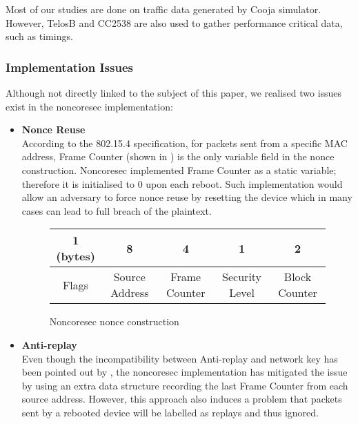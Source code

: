 Most of our studies are done on traffic data generated by Cooja simulator\cite{Contiki}. However, TelosB\cite{TelosB} and CC2538\cite{CC2538} are also used to gather performance critical data, such as timings.

\subsubsection{Implementation Issues}
Although not directly linked to the subject of this paper, we realised two issues exist in the noncoresec implementation:
\begin{itemize}
	\item \textbf{Nonce Reuse} \\
	According to the 802.15.4 specification\cite{802154}, for packets sent from a specific MAC address, Frame Counter (shown in ) is the only variable field in the nonce construction. Noncoresec implemented Frame Counter as a static variable; therefore it is initialised to 0 upon each reboot. Such implementation would allow an adversary to force nonce reuse by resetting the device which in many cases can lead to full breach of the plaintext.
	
	\begin{figure}[th!]
	\centering
	\begin{tabular}{|c|c|c|c|c|}
		\hline 
		1 (bytes) & 8              & 4             & 1              & 2             \\ \hline
		Flags      & Source Address & Frame Counter & Security Level & Block Counter \\ \hline
	\end{tabular}
	\caption{Noncoresec nonce construction}
	\label{NoncoresecNonce}
	\end{figure}
	
	\item \textbf{Anti-replay} \\
	Even though the incompatibility between Anti-replay and network key has been pointed out by \cite{802154SecIssues}, the noncoresec implementation has mitigated the issue by using an extra data structure recording the last Frame Counter from each source address. However, this approach also induces a problem that packets sent by a rebooted device will be labelled as replays and thus ignored.
	
	
\end{itemize}


